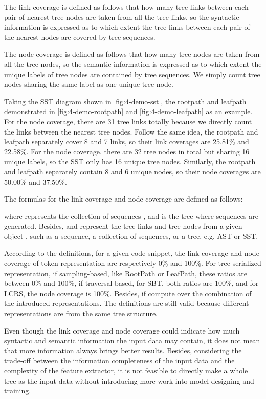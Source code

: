 \documentclass[conference]{IEEEtran}
\begin{document}
The link coverage is defined as follows that how many tree links between each pair of nearest tree nodes are taken from all the tree links, so the syntactic information is expressed as to which extent the tree links between each pair of the nearest nodes are covered by tree sequences.


The node coverage is defined as follows that how many tree nodes are taken from all the tree nodes, so the semantic information is expressed as to which extent the unique labels of tree nodes are contained by tree sequences. We simply count tree nodes sharing the same label as one unique tree node.

Taking the SST diagram shown in \autoref{fig:4-demo-sst}, the rootpath and leafpath demonstrated in \autoref{fig:4-demo-rootpath} and \autoref{fig:4-demo-leafpath} as an example. For the node coverage, there are 31 tree links totally because we directly count the links between the nearest tree nodes. Follow the same idea, the rootpath and leafpath separately cover 8 and 7 links, so their link coverages are 25.81\% and 22.58\%. For the node coverage, there are 32 tree nodes in total but sharing 16 unique labels, so the SST only has 16 unique tree nodes. Similarly, the rootpath and leafpath separately contain 8 and 6 unique nodes, so their node coverages are 50.00\% and 37.50\%.

The formulas for the link coverage and node coverage are defined as follows:





where  represents the collection of sequences , and  is the tree where sequences  are generated. Besides,  and  represent the tree links and tree nodes from a given object , such as a sequence, a collection of sequences, or a tree, e.g. AST or SST.

According to the definitions, for a given code snippet, the link coverage and node coverage of token representation are respectively 0\% and 100\%. For tree-serialized representation, if sampling-based, like RootPath or LeafPath, these ratios are between 0\% and 100\%, if traversal-based, for SBT, both ratios are 100\%, and for LCRS, the node coverage is 100\%. Besides, if compute over the combination of the introduced representations. The definitions are still valid because different representations are from the same tree structure.

Even though the link coverage and node coverage could indicate how much syntactic and semantic information the input data may contain, it does not mean that more information always brings better results. Besides, considering the trade-off between the information completeness of the input data and the complexity of the feature extractor, it is not feasible to directly make a whole tree as the input data without introducing more work into model designing and training.
\end{document}
